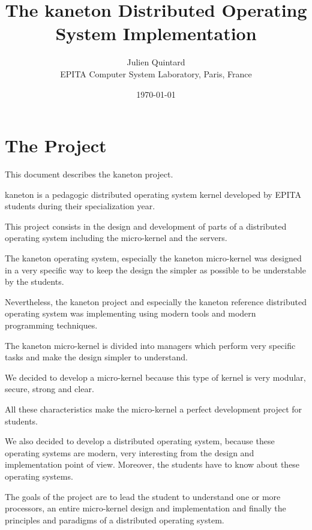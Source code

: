 \documentclass[10pt,a4wide]{article}
\title{The kaneton Distributed Operating System Implementation}
\author{\small{Julien Quintard} \\
        \scriptsize{EPITA Computer System Laboratory, Paris, France}}
\date{\scriptsize{\today}}
\begin{document}
\maketitle


\begin{abstract}

\end{abstract}

%
%



\section{The Project}

This document describes the kaneton project.

kaneton is a pedagogic distributed operating system kernel developed
by EPITA students during their specialization year.

This project consists in the design and development of parts of a
distributed operating system including the micro-kernel and the servers.

The kaneton operating system, especially the kaneton micro-kernel was
designed in a very specific way to keep the design the simpler as possible
to be understable by the students.

Nevertheless, the kaneton project and especially the kaneton reference
distributed operating system was implementing using modern tools and
modern programming techniques.

The kaneton micro-kernel is divided into managers which perform very
specific tasks and make the design simpler to understand.

We decided to develop a micro-kernel because this type of kernel is very
modular, secure, strong and clear.

All these characteristics make the micro-kernel a perfect development
project for students.

We also decided to develop a distributed operating system, because these
operating systems are modern, very interesting from the design and
implementation point of view. Moreover, the students have to know about
these operating systems.

The goals of the project are to lead the student to understand one or more
processors, an entire micro-kernel design and implementation and finally
the principles and paradigms of a distributed operating system.
\end{document}
